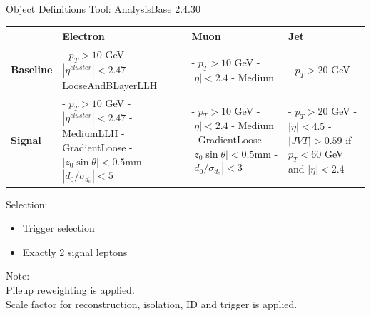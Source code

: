 \documentclass[mathserif,serif]{beamer}
\begin{document}
\begin{frame}{Object Definitions}
\small
Tool: AnalysisBase 2.4.30 \\

\centering
\begin{table}
\small
\begin{tabularx}{\textwidth}{p{1.5cm} | p{3cm} | p{3cm} | p{3cm}}
& \textbf{Electron} & \textbf{Muon} & \textbf{Jet}\\
\hline
\textbf{Baseline}
& - $p_T>10$ GeV \newline - $|\eta^{cluster}| < 2.47$ \newline - LooseAndBLayerLLH
& - $p_T>10$ GeV \newline - $|\eta| < 2.4$ \newline - Medium
& - $p_T>20$ GeV \\
\hline
\textbf{Signal}
& - $p_T > 10$ GeV \newline - $|\eta^{cluster}| < 2.47$ \newline - MediumLLH \newline - GradientLoose \newline - $|z_0 \sin \theta| < 0.5$mm \newline - $|d_0/\sigma_{d_0}| < 5$
& - $p_T > 10$ GeV \newline - $|\eta| < 2.4$ \newline - Medium \newline - GradientLoose \newline - $|z_0 \sin \theta| < 0.5$mm \newline - $|d_0/\sigma_{d_0}| < 3$
& - $p_T > 20$ GeV \newline - $|\eta|<4.5$ \newline \newline - $|JVT| > 0.59$ \newline if $p_T < 60$ GeV \newline and $|\eta| < 2.4$
\end{tabularx}
\end{table}

\raggedright
Selection:
\begin{itemize}
\item Trigger selection
\item Exactly 2 signal leptons
\end{itemize}

\tiny
Note: \\
Pileup reweighting is applied. \\
Scale factor for reconstruction, isolation, ID and trigger is applied.
\end{frame}
\end{document}
